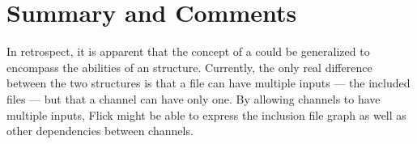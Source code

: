 

\section{Summary and Comments}
\label{sec:META:Summary and Comments}

In retrospect, it is apparent that the concept of a  could
be generalized to encompass the abilities of an  structure.
Currently, the only real difference between the two structures is that a file
can have multiple inputs --- the included files --- but that a channel can have
only one.  By allowing channels to have multiple inputs, Flick might be able to
express the inclusion file graph as well as other dependencies between
channels.



